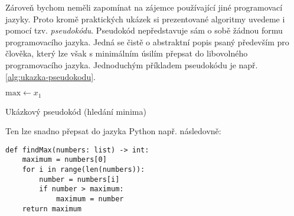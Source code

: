 Zároveň bychom neměli zapomínat na zájemce používající jiné programovací jazyky. Proto kromě praktických ukázek si prezentované algoritmy uvedeme i pomocí tzv. \emph{pseudokódu}. Pseudokód nepředstavuje sám o sobě žádnou formu programovacího jazyka. Jedná se čistě o abstraktní popis psaný především pro člověka, který lze však s minimálním úsilím přepsat do libovolného programovacího jazyka. Jednoduchým příkladem pseudokódu je např. \ref{alg:ukazka-pseudokodu}.
\begin{algorithm}[h]
    $\text{max}\gets x_1$\\
    \caption{Ukázkový pseudokód (hledání minima)}
    \label{alg:ukazka-pseudokodu}
\end{algorithm}
Ten lze snadno přepsat do jazyka Python např. následovně:
\begin{lstlisting}[style=python]
def findMax(numbers: list) -> int:
    maximum = numbers[0]
    for i in range(len(numbers)):
        number = numbers[i]
        if number > maximum:
            maximum = number
    return maximum
\end{lstlisting}
